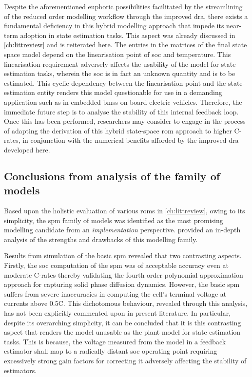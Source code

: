 Despite   the  aforementioned   euphoric   possibilities   facilitated  by   the
streamlining  of  the reduced  order  modelling  workflow through  the  improved
\gls{dra},  there  exists a  fundamental  deficiency  in this  hybrid  modelling
approach  that impede  its near-term  adoption in  state estimation  tasks. This
aspect was already discussed in \cref{ch:littreview} and is reiterated here. The
entries  in  the  matrices  of  the  final  state  space  model  depend  on  the
linearisation point of \gls{soc} and temperature. This linearisation requirement
adversely affects the usability of the model for state estimation tasks, wherein
the \gls{soc} is in fact an unknown quantity and is to be estimated. This cyclic
dependency  between  the linearisation  point  and  the state-estimation  entity
renders this  model questionable for use  in a demanding application  such as in
embedded \glspl{bms} on-board electric vehicles. Therefore, the immediate future
step is to analyse  the stability of this internal feedback  loop. Once this has
been performed,  researchers may consider to  engage in the process  of adapting
the derivation of this hybrid  state-space \gls{rom} approach to higher C-rates,
in conjunction  with the numerical  benefits afforded by the  improved \gls{dra}
developed here.

\subsection{Conclusions from analysis of the  family of models}

Based    upon   the    holistic   evaluation    of   various    \glspl{rom}   in
\cref{ch:littreview},  owing   to  its  simplicity,  the   \gls{spm}  family  of
models  was  identified  as  the  most promising  modelling  candidate  from  an
\emph{implementation}  perspective.   provided an  in-depth
analysis of the strengths and drawbacks of this modelling family.

Results from  simulation of  the basic \gls{spm}  revealed that  two contrasting
aspects. Firstly, the  \gls{soc} computation of the \gls{spm}  was of acceptable
accuracy even at moderate C-rates thereby validating the fourth order polynomial
approximation approach  for capturing  solid phase diffusion  dynamics. However,
the basic  \gls{spm} suffers  from severe inaccuracies  in computing  the cell's
terminal voltage  at currents above  0.5C. This dichotomous  behaviour, revealed
through  this  analysis, has  not  been  explicitly  commented upon  in  present
literature.  In  particular,  despite  its overarching  simplicity,  it  can  be
concluded that it is this contrasting  aspect that renders the model unusable as
the  plant model  for  state  estimation tasks.  This  is  because, the  voltage
measured  from the  model  in a  feedback  estimator shall  map  to a  radically
distant \gls{soc} operating point requiring  excessively strong gain factors for
correcting it adversely affecting the stability of estimators.

